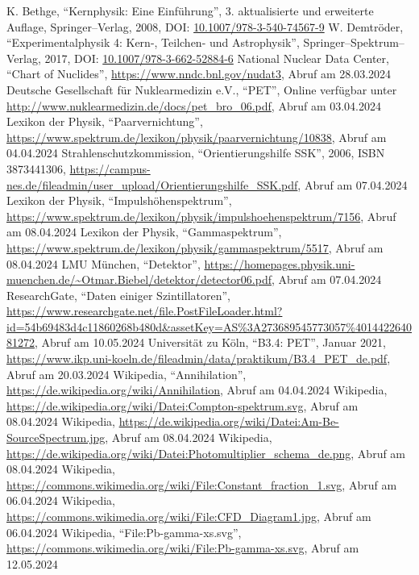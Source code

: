 \documentclass[12pt,a4paper]{scrartcl}
\numberwithin{equation}{section} %
\begin{document}
\begin{thebibliography}{99}
	K. Bethge, ``Kernphysik: Eine Einführung'', 3. aktualisierte und
	erweiterte Auflage, Springer--Verlag, 2008, DOI:
	\href{https://doi.org/10.1007/978-3-540-74567-9}{10.1007/978-3-540-74567-9}
	W. Demtröder, ``Experimentalphysik 4: Kern-, Teilchen- und
	Astrophysik'', Springer--Spektrum--Verlag, 2017, DOI:
	\href{https://link.springer.com/book/10.1007/978-3-662-52884-6}{10.1007/978-3-662-52884-6}
	National Nuclear Data Center, ``Chart of Nuclides'',
	\url{https://www.nndc.bnl.gov/nudat3}, Abruf am 28.03.2024
	Deutsche Gesellschaft für Nuklearmedizin e.V., ``PET'',
	Online verfügbar unter
	\url{http://www.nuklearmedizin.de/docs/pet_bro_06.pdf},
	Abruf am 03.04.2024
	Lexikon der Physik, ``Paarvernichtung'',
	\url{https://www.spektrum.de/lexikon/physik/paarvernichtung/10838},
	Abruf am 04.04.2024
	Strahlenschutzkommission, ``Orientierungshilfe SSK'', 2006, ISBN 3873441306,
	\url{https://campus-nes.de/fileadmin/user_upload/Orientierungshilfe_SSK.pdf}, Abruf am 07.04.2024
	Lexikon der Physik, ``Impulshöhenspektrum'',
	\url{https://www.spektrum.de/lexikon/physik/impulshoehenspektrum/7156},
	Abruf am 08.04.2024
	Lexikon der Physik, ``Gammaspektrum'',
	\url{https://www.spektrum.de/lexikon/physik/gammaspektrum/5517},
	Abruf am 08.04.2024
	LMU München, ``Detektor'',
	\url{https://homepages.physik.uni-muenchen.de/~Otmar.Biebel/detektor/detector06.pdf},
	Abruf am 07.04.2024
	ResearchGate, ``Daten einiger Szintillatoren'',
	\url{https://www.researchgate.net/file.PostFileLoader.html?id=54b69483d4c11860268b480d&assetKey=AS%3A273689545773057%401442264081272},
	Abruf am 10.05.2024
	Universität zu Köln, ``B3.4: PET'',
	Januar 2021,
	\url{https://www.ikp.uni-koeln.de/fileadmin/data/praktikum/B3.4\_PET\_de.pdf},
	Abruf am 20.03.2024
	Wikipedia, ``Annihilation'',
	\url{https://de.wikipedia.org/wiki/Annihilation}, Abruf am 04.04.2024
	Wikipedia,
	\url{https://de.wikipedia.org/wiki/Datei:Compton-spektrum.svg},
	Abruf am 08.04.2024
	Wikipedia,
	\url{https://de.wikipedia.org/wiki/Datei:Am-Be-SourceSpectrum.jpg},
	Abruf am 08.04.2024
	Wikipedia,
	\url{https://de.wikipedia.org/wiki/Datei:Photomultiplier_schema_de.png},
	Abruf am 08.04.2024
	Wikipedia,
	\url{https://commons.wikimedia.org/wiki/File:Constant_fraction_1.svg},
	Abruf am 06.04.2024
	Wikipedia,
	\url{https://commons.wikimedia.org/wiki/File:CFD_Diagram1.jpg},
	Abruf am 06.04.2024
	Wikipedia, ``File:Pb-gamma-xs.svg'',
	\url{https://commons.wikimedia.org/wiki/File:Pb-gamma-xs.svg}, Abruf am 12.05.2024
\end{thebibliography}
\end{document}
